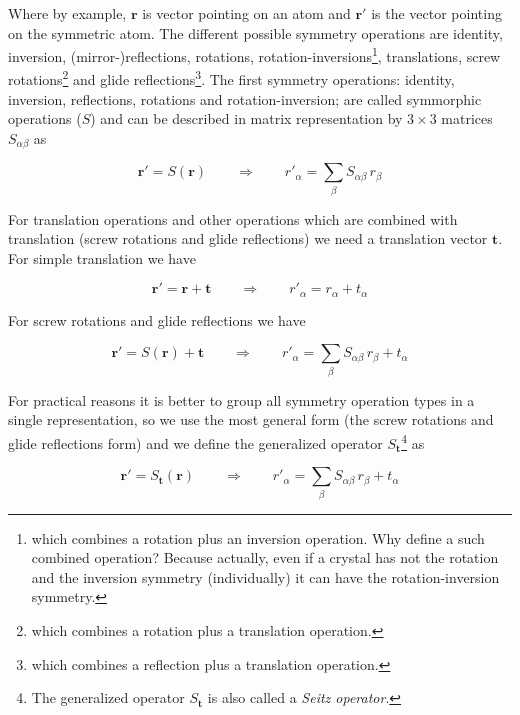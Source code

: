 \documentclass[a4paper,12pt]{report}
\begin{document}
Where by example, $\mathbf{r}$ is vector pointing on an atom and $\mathbf{r}'$ is the vector pointing on the symmetric atom. The different possible symmetry operations are identity, inversion, (mirror-)reflections, rotations, rotation-inversions\footnote{which combines a rotation plus an inversion operation. Why define a such combined operation? Because actually, even if a crystal has not the rotation and the inversion symmetry (individually) it can have the rotation-inversion symmetry.}, translations, screw rotations\footnote{which combines a rotation plus a translation operation.} and glide reflections\footnote{which combines a reflection plus a translation operation.}. The first symmetry operations: identity, inversion, reflections, rotations and rotation-inversion; are called symmorphic operations ($S$) and can be described in matrix representation by $3\times3$ matrices $S_{\alpha\beta}$ as

\begin{equation}
\mathbf{r}'= S(\mathbf{r}) \qquad \Rightarrow \qquad r'_{\alpha} = \sum_{\beta} S_{\alpha\beta} \,r_{\beta}
\end{equation}

For translation operations and other operations which are combined with translation (screw rotations and glide reflections) we need a translation vector $\mathbf{t}$. For simple translation we have

\begin{equation}
\mathbf{r}'= \mathbf{r}+\mathbf{t} \qquad \Rightarrow \qquad r'_{\alpha} = r_{\alpha} + t_{\alpha}
\end{equation}

For screw rotations and glide reflections we have

\begin{equation}
\mathbf{r}'= S(\mathbf{r})+\mathbf{t} \qquad \Rightarrow \qquad r'_{\alpha} = \sum_{\beta} S_{\alpha\beta}\, r_{\beta} + t_{\alpha}
\end{equation}

For practical reasons it is better to group all symmetry operation types in a single representation, so we use the most general form (the screw rotations and glide reflections form) and we define the generalized operator $S_{\mathbf{t}}$\footnote{The generalized operator $S_{\mathbf{t}}$ is also called a \textit{Seitz operator}.} as

\begin{equation}
\mathbf{r}'= S_{\mathbf{t}}(\mathbf{r}) \qquad \Rightarrow \qquad r'_{\alpha} = \sum_{\beta} S_{\alpha\beta} \,r_{\beta} + t_{\alpha} \label{eqStdef}
\end{equation}
\end{document}
